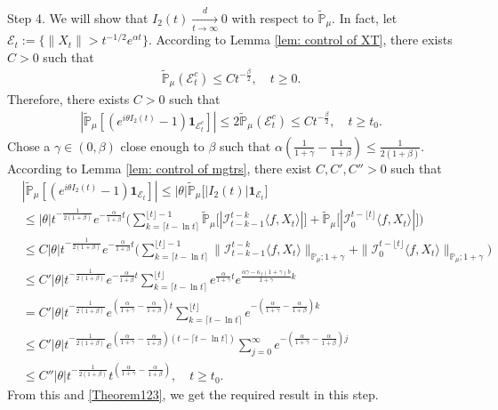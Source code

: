 \documentclass[12pt]{amsart}
\theoremstyle{plain}
\theoremstyle{definition}
\numberwithin{equation}{section}
\begin{document}
    Step 4. We will show that $I_2(t) \xrightarrow[t\to \infty]{d} 0$ with respect to $\mathbb{\tilde{P}}_{\mu}$.
    In fact, let $\mathcal{E}_t:=\{\|X_t\|>t^{-1/2}e^{\alpha t}\}$. According to Lemma \ref{lem: control of XT}, there exists $C>0$ such that
\begin{align}
    \mathbb{\tilde{P}}_{\mu}(\mathcal{E}^c_t)\leq C t^{-\frac{\beta}{2}}, \quad t\geq0.
\end{align}
    Therefore, there exists $C>0$ such that
\begin{align}\label{Theorem123}
    |\mathbb{\tilde{P}}_{\mu}[(e^{i\theta I_2(t)}-1)\mathbf{1}_{\mathcal{E}^c_t}]|
    \leq 2\mathbb{\tilde{P}}_{\mu}(\mathcal{E}^c_t)\leq Ct^{-\frac{\beta}{2}},
    \quad t\geq t_0.
\end{align}
    Chose a $\gamma\in (0,\beta)$ close enough to $\beta$ such that $\alpha(\frac{1}{1+\gamma}-\frac{1}{1+\beta})\leq \frac{1}{2(1+\beta)}$.
	According to Lemma \ref{lem: control of mgtrs}, there exist $C,C',C''>0$ such that
\begin{align*}
    &|\mathbb{\tilde{P}}_{\mu} [ (e^{i\theta I_2(t)}-1)\mathbf{1}_{\mathcal{E}_t}]|
    \leq |\theta| \mathbb{\tilde{P}}_{\mu} \big[ |I_2(t)|\mathbf{1}_{\mathcal{E}_t}\big]
    \\&\leq|\theta| t^{-\frac{1}{2(1+\beta)}}e^{-\frac{\alpha}{1+\beta}t}\Big(\sum_{k=\lceil t-\ln t \rceil}^{\lfloor t \rfloor - 1}\mathbb{\tilde{P}}_{\mu}\big[| \mathcal{I}_{t-k-1}^{t-k}\langle f,X_t\rangle|\big] + \mathbb{\tilde{P}}_{\mu}\big[| \mathcal{I}_{0}^{t-\lfloor t\rfloor}\langle f,X_t\rangle|\big]\Big)
    \\& \leq C |\theta| t^{-\frac{1}{2(1+\beta)}}e^{-\frac{\alpha}{1+\beta}t}\Big(\sum_{k=\lceil t-\ln t \rceil}^{\lfloor t \rfloor - 1}\|\mathcal{I}_{t-k-1}^{t-k}\langle f,X_t\rangle\|_{\mathbb P_\mu; 1+\gamma} + \|\mathcal I_0^{t-\lfloor t \rfloor} \langle f, X_t\rangle\|_{\mathbb P_\mu;1+\gamma}\Big)
    \\ &\leq C' |\theta| t^{-\frac{1}{2(1+\beta)}}e^{-\frac{\alpha}{1+\beta}t}\sum_{k=\lceil t-\ln t \rceil}^{\lfloor t \rfloor}e^{\frac{\alpha}{1+\gamma}t}e^{\frac{\alpha\gamma-\kappa_f(1+\gamma)b}{1+\gamma}k}\\
    &= C' |\theta| t^{-\frac{1}{2(1+\beta)}}e^{(\frac{\alpha }{1+\gamma}-\frac{\alpha }{1+\beta})t} \sum_{k=\lceil t-\ln t \rceil}^{\lfloor t \rfloor}e^{-(\frac{\alpha}{1+\gamma}-\frac{\alpha}{1+\beta})k}\\
    &\leq C' |\theta| t^{-\frac{1}{2(1+\beta)}}e^{(\frac{\alpha }{1+\gamma}-\frac{\alpha }{1+\beta})(t - \lceil t - \ln t\rceil)} \sum_{j=0}^{\infty}e^{-(\frac{\alpha}{1+\gamma}-\frac{\alpha}{1+\beta})j}\\
    &\leq C''|\theta| t^{-\frac{1}{2(1+\beta)}}t^{(\frac{\alpha}{1+\gamma}- \frac{\alpha}{1+\beta})},
    \quad t\geq t_0.
\end{align*}
	From this and \eqref{Theorem123}, we get the required result in this step.
\end{document}
